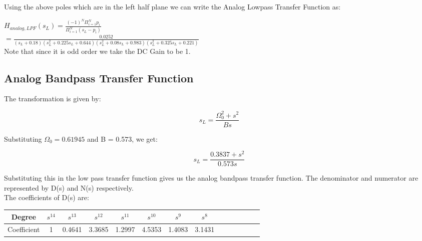 \documentclass{article}
\begin{document}
Using the above poles which are in the left half plane we can write the Analog Lowpass Transfer Function as:

      $   H_{analog,LPF}(s_L) = \frac{(-1)^N\Pi_{i=1}^{N} p_i}{\Pi_{i=1}^{N} (s_L-p_i)} $\\
     $ = \frac{0.0252}{(s_L+0.18)(s_L^2+0.225s_L+0.644)(s_L^2+0.08s_L+0.983)(s_L^2+0.325s_L+0.221)} $\\


    Note that since it is odd order we take the DC Gain to be 1.


\subsection{Analog Bandpass Transfer Function}

The transformation is given by:
\vspace{-5mm}
\begin{center}
    \begin{equation*}
        s_L = \frac{\Omega_0^2+s^2}{Bs}
    \end{equation*}
\end{center}

Substituting $\Omega_0 = 0.61945$ and B = 0.573, we get:
\vspace{-5mm}
\begin{center}
    \begin{equation*}
        s_L = \frac{0.3837+s^2}{0.573s}
    \end{equation*}
\end{center}

Substituting this in the low pass transfer function gives us the analog bandpass transfer function. The denominator and numerator are represented by D(s) and N(s) respectively.\\

The coefficients of D(s) are:

\begin{table}[H]
		\begin{center}
		\begin{tabular}{|c|c|c|c|c|c|c|c|c|c|c|c|c|c|}
			\hline
			Degree & $s^{14}$  & $s^{13}$ & $s^{12}$ & $s^{11}$ & $s^{10}$ & $s^{9}$ & $s^8$ \\
			
			\hline
                Coefficient  & 1  & 0.4641 & 3.3685 & 1.2997 & 4.5353 & 1.4083 & 3.1431 \\
                \hline
            
		\end{tabular}
		\end{center}
\end{table}
\end{document}
